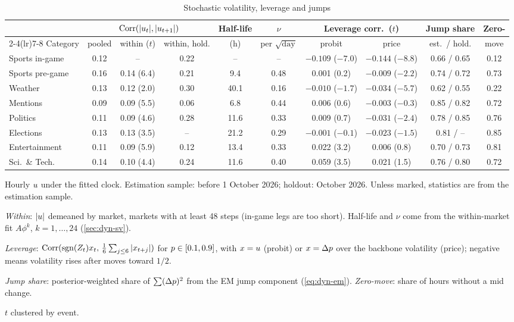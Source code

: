 \begin{table}[t]
\centering
\begin{threeparttable}
\caption{Stochastic volatility, leverage and jumps}\label{tab:dyn-sv}
\scriptsize
\setlength{\tabcolsep}{2.2pt}
\begin{tabular}{lccccccccc}
\toprule
 & \multicolumn{3}{c}{$\operatorname{Corr}(|u_t|,|u_{t+1}|)$} & Half-life & $\nu$ & \multicolumn{2}{c}{Leverage corr.\ ($t$)} & Jump share & Zero- \\
\cmidrule(lr){2-4}\cmidrule(lr){7-8}
Category & pooled & within ($t$) & within, hold. & (h) & per $\sqrt{\text{day}}$ & probit & price & est.\ / hold. & move \\
\midrule
Sports in-game & 0.12 & -- & 0.22 & -- & -- & $-0.109$ ($-7.0$) & $-0.144$ ($-8.8$) & 0.66 / 0.65 & 0.12 \\
Sports pre-game & 0.16 & 0.14 (6.4) & 0.21 & 9.4 & 0.48 & 0.001 (0.2) & $-0.009$ ($-2.2$) & 0.74 / 0.72 & 0.73 \\
Weather & 0.13 & 0.12 (2.0) & 0.30 & 40.1 & 0.16 & $-0.010$ ($-1.7$) & $-0.034$ ($-5.7$) & 0.62 / 0.55 & 0.22 \\
Mentions & 0.09 & 0.09 (5.5) & 0.06 & 6.8 & 0.44 & 0.006 (0.6) & $-0.003$ ($-0.3$) & 0.85 / 0.82 & 0.72 \\
Politics & 0.11 & 0.09 (4.6) & 0.28 & 11.6 & 0.33 & 0.009 (0.7) & $-0.031$ ($-2.4$) & 0.78 / 0.85 & 0.76 \\
Elections & 0.13 & 0.13 (3.5) & -- & 21.2 & 0.29 & $-0.001$ ($-0.1$) & $-0.023$ ($-1.5$) & 0.81 / -- & 0.85 \\
Entertainment & 0.11 & 0.09 (5.9) & 0.12 & 13.4 & 0.33 & 0.022 (3.2) & 0.006 (0.8) & 0.70 / 0.73 & 0.81 \\
Sci.\ \& Tech. & 0.14 & 0.10 (4.4) & 0.24 & 11.6 & 0.40 & 0.059 (3.5) & 0.021 (1.5) & 0.76 / 0.80 & 0.72 \\
\bottomrule
\end{tabular}
\begin{tablenotes}[flushleft]\footnotesize
\item Hourly $u$ under the fitted clock. Estimation sample: before 1 October 2026; holdout: October 2026. Unless marked, statistics are from the estimation sample.
\item \emph{Within}: $|u|$ demeaned by market, markets with at least 48 steps (in-game legs are too short). Half-life and $\nu$ come from the within-market fit $A\phi^k$, $k=1,\ldots,24$ (\cref{sec:dyn-sv}).
\item \emph{Leverage}: $\operatorname{Corr}(\operatorname{sgn}(Z_t)x_t,\,\tfrac16\sum_{j\le6}|x_{t+j}|)$ for $p\in[0.1,0.9]$, with $x=u$ (probit) or $x=\Delta p$ over the backbone volatility (price); negative means volatility rises after moves toward $1/2$.
\item \emph{Jump share}: posterior-weighted share of $\sum(\Delta p)^2$ from the EM jump component (\cref{eq:dyn-em}). \emph{Zero-move}: share of hours without a mid change.
\item $t$ clustered by event.
\end{tablenotes}
\end{threeparttable}
\end{table}

